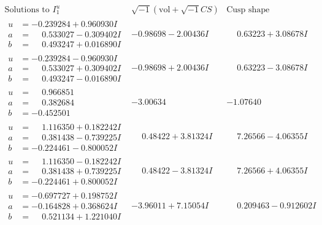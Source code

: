\documentclass[1p]{elsarticle_modified}
\theoremstyle{definition}
\newcommand{\I}{\sqrt{-1}}
\begin{document}
$$\begin{array}{c|c|c}  
\text{Solutions to }I^u_{1}& \I (\text{vol} + \sqrt{-1}CS) & \text{Cusp shape}\\
 \hline 
\begin{aligned}
u &= -0.239284 + 0.960930 I \\
a &= \phantom{-}0.533027 - 0.309402 I \\
b &= \phantom{-}0.493247 + 0.016890 I\end{aligned}
 & -0.98698 - 2.00436 I & \phantom{-}0.63223 + 3.08678 I \\ \hline\begin{aligned}
u &= -0.239284 - 0.960930 I \\
a &= \phantom{-}0.533027 + 0.309402 I \\
b &= \phantom{-}0.493247 - 0.016890 I\end{aligned}
 & -0.98698 + 2.00436 I & \phantom{-}0.63223 - 3.08678 I \\ \hline\begin{aligned}
u &= \phantom{-}0.966851\phantom{ +0.000000I} \\
a &= \phantom{-}0.382684\phantom{ +0.000000I} \\
b &= -0.452501\phantom{ +0.000000I}\end{aligned}
 & -3.00634\phantom{ +0.000000I} & -1.07640\phantom{ +0.000000I} \\ \hline\begin{aligned}
u &= \phantom{-}1.116350 + 0.182242 I \\
a &= \phantom{-}0.381438 - 0.739225 I \\
b &= -0.224461 - 0.800052 I\end{aligned}
 & \phantom{-}0.48422 + 3.81324 I & \phantom{-}7.26566 - 4.06355 I \\ \hline\begin{aligned}
u &= \phantom{-}1.116350 - 0.182242 I \\
a &= \phantom{-}0.381438 + 0.739225 I \\
b &= -0.224461 + 0.800052 I\end{aligned}
 & \phantom{-}0.48422 - 3.81324 I & \phantom{-}7.26566 + 4.06355 I \\ \hline\begin{aligned}
u &= -0.697727 + 0.198752 I \\
a &= -0.164828 + 0.368624 I \\
b &= \phantom{-}0.521134 + 1.221040 I\end{aligned}
 & -3.96011 + 7.15054 I & \phantom{-}0.209463 - 0.912602 I \\ \hline\begin{aligned}

\end{aligned}
\end{array}$$
\end{document}
